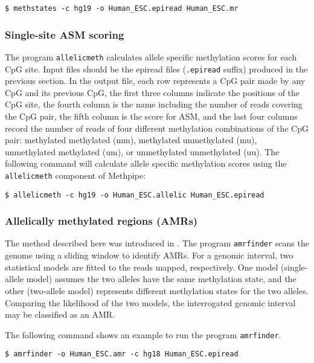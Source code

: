 \documentclass[10pt]{article}
\newcommand{\prog}[1]{\texttt{#1}}
\newcommand{\fn}[1]{\texttt{#1}}
\begin{document}
\begin{verbatim}
$ methstates -c hg19 -o Human_ESC.epiread Human_ESC.mr 
\end{verbatim}


\subsubsection{Single-site ASM scoring}
\label{sec:allelic_scores}

The program \prog{allelicmeth} calculates allele specific methylation
scores for each CpG site. Input files should be the epiread files
(\fn{.epiread} suffix) produced in the previous section. In the
output file, each row represents a CpG pair made by any CpG and its
previous CpG, the first three columns indicate the positions of the
CpG site, the fourth column is the name including the number of reads
covering the CpG pair, the fifth column is the score for ASM, and the
last four columns record the number of reads of four different
methylation combinations of the CpG pair: methylated methylated (mm),
methylated unmethylated (mu), unmethylated methylated (um), or
unmethylated unmethylated (uu). The following command will calculate
allele specific methylation scores using the \prog{allelicmeth}
component of Methpipe:

\begin{verbatim}
$ allelicmeth -c hg19 -o Human_ESC.allelic Human_ESC.epiread
\end{verbatim}

\subsubsection{Allelically methylated regions (AMRs)}

The method described here was introduced in \cite{fang2012genomic}.
The program \prog{amrfinder} scans the genome using a sliding window
to identify AMRs. For a genomic interval, two statistical models are
fitted to the reads mapped, respectively. One model (single-allele
model) assumes the two alleles have the same methylation state, and
the other (two-allele model) represents different methylation states
for the two alleles. Comparing the likelihood of the two models, the
interrogated genomic interval may be classified as an AMR.

The following command shows an example to run the program
\prog{amrfinder}.
\begin{verbatim}
$ amrfinder -o Human_ESC.amr -c hg18 Human_ESC.epiread
\end{verbatim}
\end{document}
